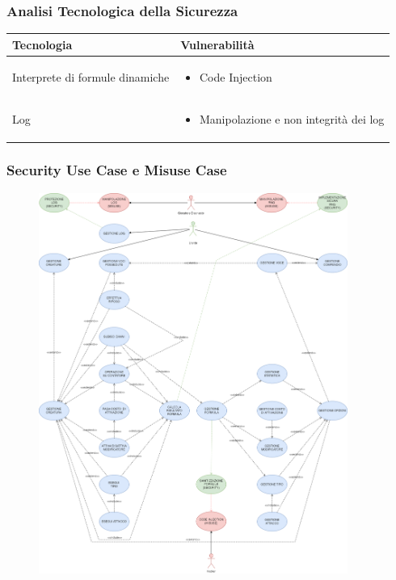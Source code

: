 \documentclass[a4paper, 11pt]{article}
\begin{document}
\subsubsection*{Analisi Tecnologica della Sicurezza}
\begin{center}
    \begin{tabular}{|p{6cm}|p{8cm}|}
        \hline
        \textbf{Tecnologia} & \textbf{Vulnerabilità} \\
        \hline
        Interprete di formule dinamiche & 
        \begin{itemize}
            \item Code Injection
        \end{itemize} \\
        
        \hline
        Log &
        \begin{itemize}
            \item Manipolazione e non integrità dei log
        \end{itemize}\\
        \hline 
    \end{tabular}
\end{center}



\newpage



\subsubsection{Security Use Case e Misuse Case}
\vspace{2em}
\begin{figure}[h!]
    \centering
    \includegraphics[width=0.9\textwidth,keepaspectratio]{Diagramma CU-Security}
    \label{fig:security}
\end{figure}
\end{document}
